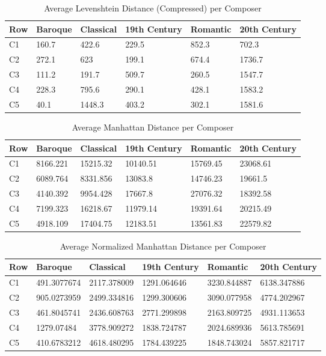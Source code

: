 \begin{longtable}{|l|l|l|l|l|l|}
\caption{Average Levenshtein Distance (Compressed) per Composer}
\label{my-label}\\
\hline
Row & Baroque & Classical & 19th Century & Romantic & 20th Century  \\ \hline
\endfirsthead
%
\endhead
%
C1 & 160.7 & 422.6 & 229.5 & 852.3 & 702.3 \\ \hline
C2 & 272.1 & 623 & 199.1 & 674.4 & 1736.7 \\ \hline
C3 & 111.2 & 191.7 & 509.7 & 260.5 & 1547.7 \\ \hline
C4 & 228.3 & 795.6 & 290.1 & 428.1 & 1583.2 \\ \hline
C5 & 40.1 & 1448.3 & 403.2 & 302.1 & 1581.6 \\ \hline
\end{longtable}

\begin{longtable}{|l|l|l|l|l|l|}
\caption{Average Manhattan Distance per Composer}
\label{my-label}\\
\hline
Row & Baroque & Classical & 19th Century & Romantic & 20th Century \\ \hline
\endfirsthead
%
\endhead
%
C1 & 8166.221 & 15215.32 & 10140.51 & 15769.45 & 23068.61 \\ \hline
C2 & 6089.764 & 8331.856 & 13083.8 & 14746.23 & 19661.5 \\ \hline
C3 & 4140.392 & 9954.428 & 17667.8 & 27076.32 & 18392.58 \\ \hline
C4 & 7199.323 & 16218.67 & 11979.14 & 19391.64 & 20215.49 \\ \hline
C5 & 4918.109 & 17404.75 & 12183.51 & 13561.83 & 22579.82 \\ \hline
\end{longtable}

\begin{longtable}{|l|l|l|l|l|l|}
\caption{Average Normalized Manhattan Distance per Composer}
\label{my-label}\\
\hline
Row & Baroque & Classical & 19th Century & Romantic & 20th Century \\ \hline
\endfirsthead
%
\endhead
%
C1 & 491.3077674 & 2117.378009 & 1291.064646 & 3230.844887 & 6138.347886 \\ \hline
C2 & 905.0273959 & 2499.334816 & 1299.300606 & 3090.077958 & 4774.202967 \\ \hline
C3 & 461.8045741 & 2436.608763 & 2771.299898 & 2163.809725 & 4931.113653 \\ \hline
C4 & 1279.07484 & 3778.909272 & 1838.724787 & 2024.689936 & 5613.785691 \\ \hline
C5 & 410.6783212 & 4618.480295 & 1784.439225 & 1848.743024 & 5857.821717 \\ \hline
\end{longtable}

